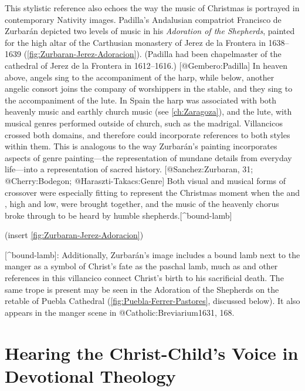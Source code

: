 This stylistic reference also echoes the way the music of Christmas is portrayed
in contemporary Nativity images.
Padilla's Andalusian compatriot Francisco de Zurbarán depicted two levels of
music in his \emph{Adoration of the Shepherds}, painted for the high altar of the
Carthusian monastery of Jerez de la Frontera in 1638--1639
(\cref{fig:Zurbaran-Jerez-Adoracion}).
(Padilla had been chapelmaster of the cathedral of Jerez de la Frontera in
1612--1616.)
[@Gembero:Padilla]
In heaven above, angels sing to the accompaniment of the harp, while below,
another angelic consort joins the company of worshippers in the stable, and they
sing to the accompaniment of the lute.
In Spain the harp was associated with both heavenly music and earthly church
music (see \cref{ch:Zaragoza}), and the lute, with musical genres
performed outside of church, such as the madrigal.
Villancicos crossed both domains, and therefore could incorporate references to
both styles within them.
This is analogous to the way Zurbarán's painting incorporates aspects of genre
painting---the representation of mundane details from everyday life---into a
representation of sacred history.
[@Sanchez:Zurbaran, 31; @Cherry:Bodegon; @Haraszti-Takacs:Genre]
Both visual and musical forms of crossover were especially fitting to represent
the Christmas moment when the  and , high and low, were brought
together, and the music of the heavenly chorus broke through to be heard by
humble shepherds.[^bound-lamb]

(insert \cref{fig:Zurbaran-Jerez-Adoracion})
\label{fig:Zurbaran-Jerez-Adoracion}

[^bound-lamb]:
Additionally, Zurbarán's image includes a bound lamb next to the manger as a
symbol of Christ's fate as the paschal lamb, much as  and
other references in this villancico connect Christ's birth to his sacrificial
death.
The same trope is present may be seen in the Adoration of the Shepherds on the
retable of Puebla Cathedral (\cref{fig:Puebla-Ferrer-Pastores}, discussed
below).
It also appears in the manger scene in @Catholic:Breviarium1631, 168.


\section{Hearing the Christ-Child's Voice in Devotional Theology }

